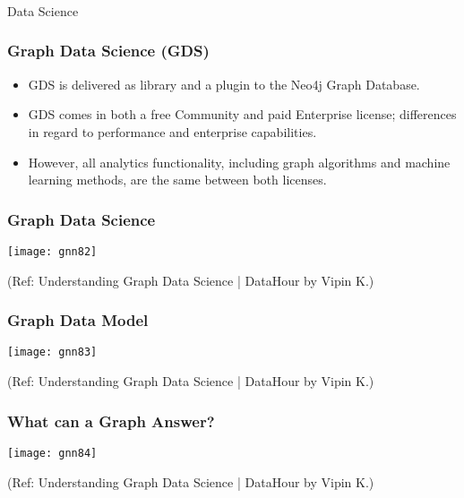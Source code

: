\begin{frame}[fragile]\frametitle{}
\begin{center}
{\Large Data Science}
\end{center}
\end{frame}

\begin{frame}[fragile]\frametitle{Graph Data Science (GDS)}
\begin{itemize}
\item GDS is delivered as library and a plugin to the Neo4j Graph Database. 
\item GDS comes in both a free Community and paid Enterprise license; differences in regard to performance and enterprise capabilities. 
\item However, all analytics functionality, including graph algorithms and machine learning methods, are the same between both licenses.
\end{itemize}

\end{frame}

\begin{frame}[fragile]\frametitle{Graph Data Science}

\begin{center}
\texttt{[image: gnn82]}

{\tiny (Ref: Understanding Graph Data Science | DataHour by Vipin K.)}
\end{center}	  

\end{frame}

\begin{frame}[fragile]\frametitle{Graph Data Model}

\begin{center}
\texttt{[image: gnn83]}

{\tiny (Ref: Understanding Graph Data Science | DataHour by Vipin K.)}
\end{center}	  

\end{frame}

\begin{frame}[fragile]\frametitle{What can a Graph Answer?}

\begin{center}
\texttt{[image: gnn84]}

{\tiny (Ref: Understanding Graph Data Science | DataHour by Vipin K.)}
\end{center}	  

\end{frame}

